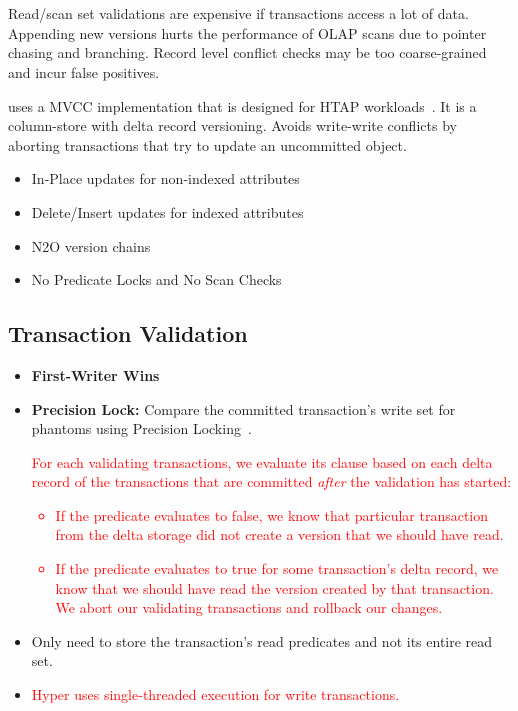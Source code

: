 \documentclass[11pt]{article}
\newcommand{\rr}[1]{\textcolor{red}{#1}}
\begin{document}
\section{}
Read/scan set validations are expensive if transactions access a lot of data. Appending new versions 
hurts the performance of OLAP scans due to pointer chasing and branching. Record level conflict 
checks may be too coarse-grained and incur false positives.

 uses a MVCC implementation that is designed for HTAP workloads~\cite{p677-neumann}. 
It is a column-store with delta record versioning. Avoids write-write conflicts by aborting 
transactions that try to update an uncommitted object.
\begin{itemize}
    \item In-Place updates for non-indexed attributes
    \item Delete/Insert updates for indexed attributes
    \item N2O version chains
    \item No Predicate Locks and No Scan Checks
\end{itemize}

\subsection*{Transaction Validation}
\begin{itemize}
    \item \textbf{First-Writer Wins}
    \item \textbf{Precision 
    Lock:} Compare the committed transaction's write set for phantoms using Precision Locking~\cite{jordan81}. \rr{For each validating transactions, we evaluate its \sql{WHERE} clause based on each delta record of the transactions that are committed \textit{after} the validation has started:
    \begin{itemize}
        \item If the predicate evaluates to false, we know that particular transaction from the delta storage did not create a version that we should have read.
        \item If the predicate evaluates to true for some transaction's delta record, we know that we should have read the version created by that transaction. We abort our validating transactions and rollback our changes.
    \end{itemize}}
    \item
    Only need to store the transaction's read predicates and not its entire read set.
    \item \rr{Hyper uses single-threaded execution for write transactions.}

\end{itemize}
\end{document}
